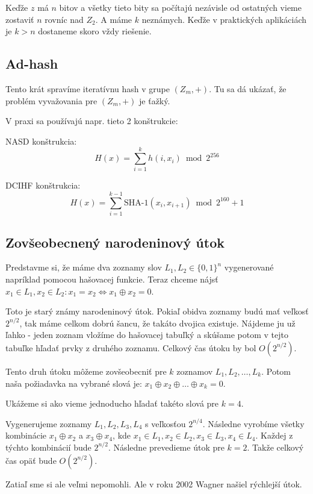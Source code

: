 Keďže $z$ má $n$ bitov a všetky tieto bity sa počítajú nezávisle od ostatných vieme
zostaviť $n$ rovníc nad $Z_2$. A máme $k$ neznámych. Keďže v praktických
aplikáciách je $k > n$ dostaneme skoro vždy riešenie.


\subsection{Ad-hash}

Tento krát spravíme iteratívnu hash v grupe $(Z_m, +)$.
Tu sa dá ukázať, že problém vyvažovania pre $(Z_m, +)$
je ťažký. 

V praxi sa používajú napr. tieto 2 konštrukcie:

NASD konštrukcia:
$$H(x) = \displaystyle\sum_{i=1}^k h(i, x_i) \bmod 2^{256}$$

DCIHF konštrukcia:
$$H(x) = \displaystyle\sum_{i=1}^{k-1} \textrm{SHA-1}(x_i, x_{i+1}) \bmod 2^{160}+1$$

\subsection{Zovšeobecnený narodeninový útok}

Predstavme si, že máme dva zoznamy slov $L_1, L_2 \in \{0,1\}^n$ vygenerované
napríklad pomocou hašovacej funkcie. Teraz chceme nájsť
$x_1 \in L_1, x_2 \in L_2\colon x_1 = x_2 \Leftrightarrow x_1 \oplus x_2 = 0$.

Toto je starý známy narodeninový útok. Pokiaľ obidva zoznamy budú mať veľkosť
$2^{n/2}$, tak máme celkom dobrú šancu, že takáto dvojica existuje. Nájdeme ju
už ľahko - jeden zoznam vložíme do hašovacej tabuľký a skúšame potom v tejto
tabuľke hľadať prvky z druhého zoznamu.
Celkový čas útoku by bol $O(2^{n/2})$.

Tento druh útoku môžeme zovšeobecniť pre $k$ zoznamov $L_1, L_2, \dots, L_k$.
Potom naša požiadavka na vybrané slová je: $x_1 \oplus x_2 \oplus \dots \oplus x_k = 0$.

Ukážeme si ako vieme jednoducho hľadať takéto slová pre $k=4$.

Vygenerujeme zoznamy $L_1, L_2, L_3, L_4$ s veľkosťou $2^{n/4}$. 
Následne vyrobíme všetky kombinácie $x_1 \oplus x_2$ a $x_3 \oplus x_4$, kde
$x_1 \in L_1, x_2 \in L_2, x_3 \in L_3, x_4 \in L_4$.
Každej z týchto kombinácií bude $2^{n/2}$. Následne prevedieme útok pre $k=2$.
Takže celkový čas opäť bude $O(2^{n/2})$.

Zatiaľ sme si ale veľmi nepomohli. Ale v roku 2002 Wagner \cite{birthday}
našiel rýchlejší útok.

